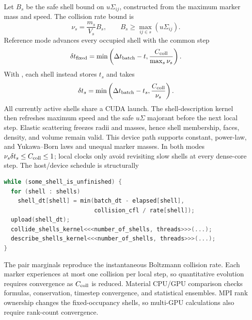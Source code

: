 Let \(B_s\) be the safe shell bound on \(u\Sigma_{ij}\), constructed from
the maximum marker mass and speed.  The collision rate bound is
\begin{equation}
 \nu_s=\frac{m_s}{V_s}B_s,\qquad
 B_s\ge\max_{ij\in s}(u\Sigma_{ij}).
\end{equation}
Reference mode advances every occupied shell with the common step
\begin{equation}
 \delta t_{\rm fixed}=\min\left(
 \Delta t_{\rm batch}-t,
 \frac{C_{\rm coll}}{\max_s\nu_s}\right).
\end{equation}
With , each shell instead stores \(t_s\)
and takes
\begin{equation}
 \delta t_s=\min\left(
 \Delta t_{\rm batch}-t_s,
 \frac{C_{\rm coll}}{\nu_s}\right).
\end{equation}
All currently active shells share a CUDA launch.  The shell-description kernel
then refreshes maximum speed and the safe \(u\Sigma\) majorant before the next
local step.  Elastic scattering freezes radii and masses, hence shell
membership, faces, density, and volume remain valid.  This device path supports
constant, power-law, and Yukawa--Born laws and unequal marker masses.  In both
modes \(\nu_s\delta t_s\le C_{\rm coll}\le1\); local clocks only avoid
revisiting slow shells at every dense-core step.
The host/device schedule is structurally
\par\noindent\begin{minipage}{\linewidth}
\begin{lstlisting}[language=C++]
while (some_shell_is_unfinished) {
  for (shell : shells)
    shell_dt[shell] = min(batch_dt - elapsed[shell],
                          collision_cfl / rate[shell]);
  upload(shell_dt);
  collide_shells_kernel<<<number_of_shells, threads>>>(...);
  describe_shells_kernel<<<number_of_shells, threads>>>(...);
}
\end{lstlisting}
\end{minipage}
The pair marginals reproduce the instantaneous Boltzmann collision rate.
Each marker experiences at most one collision per local step, so quantitative
evolution requires convergence as \(C_{\rm coll}\) is reduced.  Material
CPU/GPU comparison checks formulas, conservation, timestep convergence, and
statistical ensembles.  MPI rank ownership changes the fixed-occupancy
shells, so multi-GPU calculations also require rank-count convergence.

